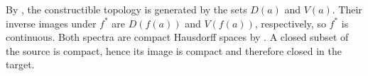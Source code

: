 By , the constructible topology is generated by the sets $D(a)$ and $V(a)$. Their inverse images under $f^*$ are $D(f(a))$ and $V(f(a))$, respectively, so $f^*$ is continuous. Both spectra are compact Hausdorff spaces by . A closed subset of the source is compact, hence its image is compact and therefore closed in the target.
